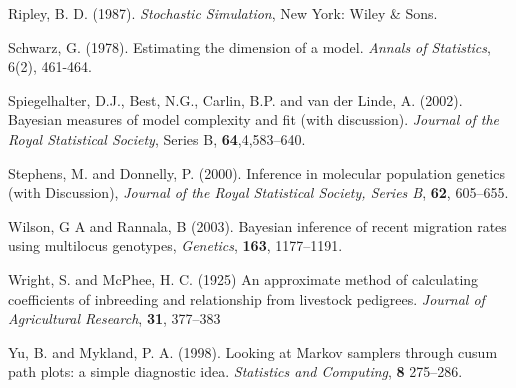 Ripley, B. D. (1987). {\em Stochastic Simulation},  New York: Wiley \& Sons.



Schwarz, G.  (1978).  Estimating the dimension of a model. {\em Annals of
Statistics}, 6(2), 461-464.

Spiegelhalter, D.J., Best, N.G., Carlin, B.P. and van der Linde, A.  (2002).
Bayesian measures of model complexity and fit (with discussion).  {\em
Journal of the Royal Statistical Society}, Series B, {\bf 64},4,583--640.

Stephens, M. and Donnelly, P. (2000). Inference in molecular population genetics (with Discussion), {\em Journal of the Royal Statistical Society, Series B}, {\bf 62}, 605--655.


Wilson, G A and Rannala, B  (2003).
  Bayesian inference of recent migration rates using multilocus genotypes,
  {\em Genetics},
  {\bf 163}, 1177--1191.




Wright, S. and McPhee, H. C. (1925) An approximate method of calculating coefficients of inbreeding and relationship from livestock pedigrees. {\em Journal of Agricultural Research}, {\bf 31}, 377--383


Yu, B. and Mykland, P. A.  (1998).  Looking at Markov samplers through cusum
path plots: a simple diagnostic idea.  {\em Statistics and Computing}, {\bf
8} 275--286.



